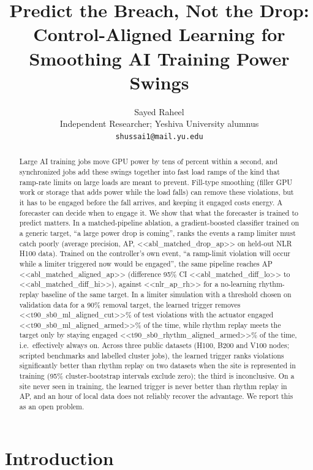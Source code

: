 \documentclass[11pt]{article}
\title{Predict the Breach, Not the Drop:\\Control-Aligned Learning for Smoothing AI Training Power Swings}
\author{Sayed Raheel\\\small Independent Researcher; Yeshiva University alumnus\\\small\texttt{shussai1@mail.yu.edu}}
\date{}
\begin{document}
\maketitle

\begin{abstract}
Large AI training jobs move GPU power by tens of percent within a second, and synchronized jobs add
these swings together into fast load ramps of the kind that ramp-rate limits on large loads are meant to
prevent. Fill-type smoothing (filler GPU
work or storage that adds power while the load falls) can remove these violations, but it has to be
engaged before the fall arrives, and keeping it engaged costs energy. A forecaster can decide when to
engage it. We show that what the forecaster is trained to predict matters.
In a matched-pipeline ablation, a gradient-boosted classifier trained on a generic
target, ``a large power drop is coming'', ranks the events a ramp limiter must catch poorly (average
precision, AP, <<abl_matched_drop_ap>> on held-out NLR H100 data). Trained on the controller's own event,
``a ramp-limit violation will occur while a limiter triggered now would be engaged'', the same pipeline
reaches AP <<abl_matched_aligned_ap>> (difference 95\% CI <<abl_matched_diff_lo>> to
<<abl_matched_diff_hi>>), against <<nlr_ap_rh>> for a no-learning rhythm-replay baseline of the same
target. In a limiter simulation with a threshold chosen on validation
data for a 90\% removal target, the learned trigger removes <<t90_sb0_ml_aligned_cut>>\% of test violations
with the actuator engaged <<t90_sb0_ml_aligned_armed>>\% of the time, while rhythm replay meets the target
only by staying engaged <<t90_sb0_rhythm_aligned_armed>>\% of the time, i.e.\ effectively always on. Across
three public datasets (H100, B200 and V100 nodes; scripted benchmarks and labelled cluster jobs), the learned trigger
ranks violations significantly better than rhythm replay on two datasets when the site is represented in
training (95\% cluster-bootstrap intervals exclude zero); the third is inconclusive. On a site never seen in training, the learned trigger is never
better than rhythm replay in AP, and an hour of local data does not reliably recover the advantage. We
report this as an open problem.
\end{abstract}

\section{Introduction}
\end{document}
